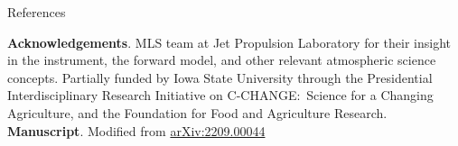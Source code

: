 \documentclass[final]{beamer}
\newlength{\sepwidth}
\newlength{\colwidth}
\newcommand{\separatorcolumn}{\begin{column}{\sepwidth}\end{column}}
\begin{document}
\begin{frame}[t]
{\begin{minipage}[t][76cm][t]{58cm}
\begin{minipage}[t]{58cm}
\begin{minipage}[t]{28cm}
          \begin{block}{References}
            \vspace{-1ex}
            \renewcommand*{\bibfont}{\small}
            \printbibliography[heading=none]{}
          \end{block}
        \end{minipage}
      \end{minipage}
    \end{minipage}%
  }
  \colorbox{black!0}{
    \begin{minipage}[t][76cm][t]{3cm}
    \end{minipage}%
  }

  \begin{minipage}[t][5cm][t]{116cm}
    \textbf{Acknowledgements}. MLS team at Jet Propulsion
    Laboratory for their insight in the instrument, the forward model, and other
    relevant atmospheric science concepts.
    Partially funded by Iowa State University through the
    Presidential Interdisciplinary Research Initiative on C-CHANGE:~Science
    for a Changing Agriculture, and the Foundation for Food and Agriculture
    Research.
    \textbf{Manuscript}. Modified from
    \href{https://doi.org/10.48550/arXiv.2209.00044}{arXiv:2209.00044}
  \end{minipage}

















\end{frame}
\end{document}
